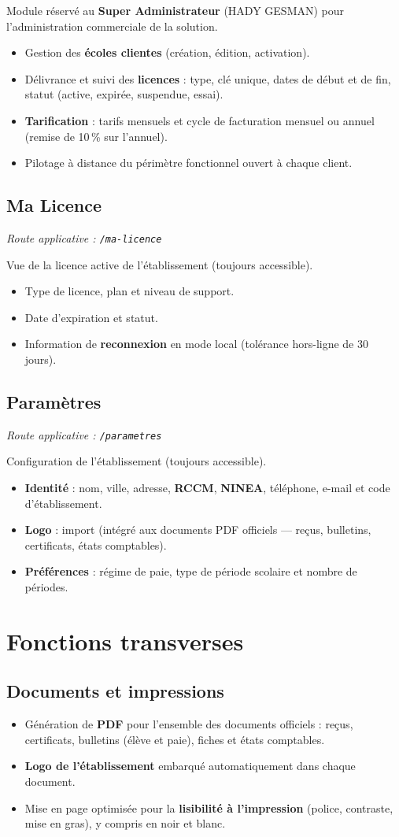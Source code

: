 \documentclass[11pt,a4paper]{report}
\newcommand{\feat}[1]{\item #1}
\newcommand{\modtag}[1]{{\small\color{sagigray}\textit{Route applicative : \texttt{#1}}}}
\begin{document}
\noindent Module réservé au \textbf{Super Administrateur} (HADY GESMAN) pour
l'administration commerciale de la solution.
\begin{itemize}
\feat{Gestion des \textbf{écoles clientes} (création, édition, activation).}
\feat{Délivrance et suivi des \textbf{licences} : type, clé unique, dates de
début et de fin, statut (active, expirée, suspendue, essai).}
\feat{\textbf{Tarification} : tarifs mensuels et cycle de facturation
mensuel ou annuel (remise de 10\,\% sur l'annuel).}
\feat{Pilotage à distance du périmètre fonctionnel ouvert à chaque client.}
\end{itemize}

\section{Ma Licence}
\modtag{/ma-licence}

\noindent Vue de la licence active de l'établissement (toujours accessible).
\begin{itemize}
\feat{Type de licence, plan et niveau de support.}
\feat{Date d'expiration et statut.}
\feat{Information de \textbf{reconnexion} en mode local (tolérance hors-ligne
de 30 jours).}
\end{itemize}

\section{Paramètres}
\modtag{/parametres}

\noindent Configuration de l'établissement (toujours accessible).
\begin{itemize}
\feat{\textbf{Identité} : nom, ville, adresse, \textbf{RCCM}, \textbf{NINEA},
téléphone, e-mail et code d'établissement.}
\feat{\textbf{Logo} : import (intégré aux documents PDF officiels --- reçus,
bulletins, certificats, états comptables).}
\feat{\textbf{Préférences} : régime de paie, type de période scolaire et
nombre de périodes.}
\end{itemize}

\chapter{Fonctions transverses}

\section{Documents et impressions}
\begin{itemize}
\feat{Génération de \textbf{PDF} pour l'ensemble des documents officiels :
reçus, certificats, bulletins (élève et paie), fiches et états comptables.}
\feat{\textbf{Logo de l'établissement} embarqué automatiquement dans chaque
document.}
\feat{Mise en page optimisée pour la \textbf{lisibilité à l'impression}
(police, contraste, mise en gras), y compris en noir et blanc.}
\end{itemize}
\end{document}
